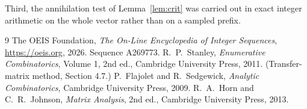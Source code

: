 \documentclass[11pt,a4paper]{article}
\theoremstyle{plain}
\theoremstyle{definition}
\begin{document}
Third, the annihilation test of Lemma~\ref{lem:crit} was carried out in exact integer
arithmetic on the whole vector rather than on a sampled prefix.

\begin{thebibliography}{9}
 The OEIS Foundation, \emph{The On-Line Encyclopedia of Integer
Sequences}, \url{https://oeis.org}, 2026. Sequence A269773.
 R.~P.~Stanley, \emph{Enumerative Combinatorics}, Volume 1, 2nd ed.,
Cambridge University Press, 2011. (Transfer-matrix method, Section 4.7.)
 P.~Flajolet and R.~Sedgewick, \emph{Analytic Combinatorics}, Cambridge
University Press, 2009.
 R.~A.~Horn and C.~R.~Johnson, \emph{Matrix Analysis}, 2nd ed., Cambridge
University Press, 2013.
\end{thebibliography}
\end{document}
